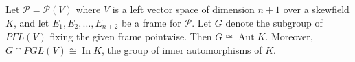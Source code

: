 Let $\mathcal{P} = \mathcal{P}(V)$ where $V$ is a left vector space of dimension $n+1$ over a skewfield $K$, and let $E_1, E_2, \dots, E_{n+2}$ be a frame for $\mathcal{P}$. Let $G$ denote the subgroup of $P\Gamma L(V)$ fixing the given frame pointwise. Then $G \cong \operatorname{Aut} K$. Moreover, $G \cap PGL(V) \cong \operatorname{In} K$, the group of inner automorphisms of $K$.

